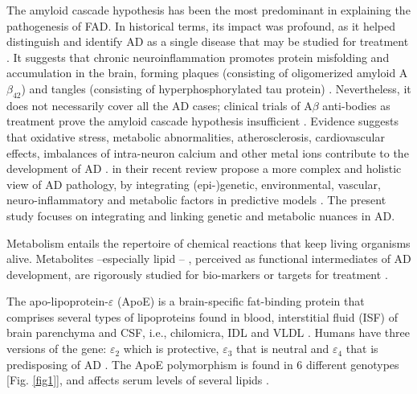 \documentclass{amsart}
\theoremstyle{plain}
\begin{document}
The amyloid cascade hypothesis has been the most predominant in explaining the pathogenesis of FAD. In historical terms, its impact was profound, as it helped distinguish and identify AD as a single disease that may be studied for treatment \cite{Hardy2006AlzheimersReappraisal}. It suggests that chronic neuroinflammation promotes protein misfolding and accumulation in the brain, forming plaques (consisting of oligomerized amyloid A$\beta_{42}$) and tangles (consisting of hyperphosphorylated tau protein) \cite{Edwards2019ANeurodegeneration}. Nevertheless, it does not necessarily cover all the AD cases; clinical trials of A$\beta$ anti-bodies as treatment prove the amyloid cascade hypothesis insufficient \cite{Kepp2023TheReview,Kurkinen2023TheThinking}. Evidence suggests that oxidative stress, metabolic abnormalities, atherosclerosis, cardiovascular effects, imbalances of intra-neuron calcium and other metal ions contribute to the development of AD \cite{Kepp2023TheReview}. \citeauthor{Kepp2023TheReview} in their recent review propose a more complex and holistic view of AD pathology, by integrating (epi-)genetic, environmental, vascular, neuro-inflammatory and metabolic factors in predictive models \cite{Kepp2023TheReview}. The present study focuses on integrating and linking genetic and metabolic nuances in AD.

Metabolism entails the repertoire of chemical reactions that keep living organisms alive. Metabolites  --especially lipid \cite{Barupal2019SetsPathophysiology,Fernandez-Calle2022APOEDiseases, Proitsi2017AssociationAnalysis}-- , perceived as functional intermediates of AD development, are rigorously studied for bio-markers or targets for treatment \cite{Oeckl2019ADisease}.

The apo-lipoprotein-$\varepsilon$ (ApoE) is a brain-specific fat-binding protein that comprises several types of lipoproteins found in blood, interstitial fluid (ISF) of brain parenchyma and CSF, i.e., chilomicra, IDL and VLDL \cite{Husain2021APOETherapeutics}. Humans have three versions of the gene: $\varepsilon_2$ which is protective, $\varepsilon_3$ that is neutral and $\varepsilon_4$ that is predisposing of AD \cite{Husain2021APOETherapeutics}. The ApoE polymorphism is found in 6 different genotypes [Fig. \ref{fig1}], and affects serum levels of several lipids \cite{Gan2022EffectsPopulation}.
\end{document}
